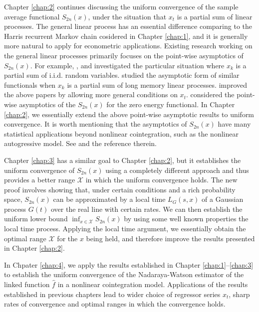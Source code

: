 Chapter \ref{chap:2} continues discussing the uniform convergence of the sample average functional $S_{2n}(x)$, under the situation that $x_t$ is a partial sum of linear processes. The general linear process has an essential difference comparing to the Harris recurrent Markov chain cosidered in Chapter \ref{chap:1}, and it is generally more natural to apply for econometric applications. Existing research working on the general linear processes primarily focuses on the point-wise asymptotics of $S_{2n}(x)$. For example, \cite{borodinibragimov1995}, \cite{akonom1993} and \cite{phillipspark1998} investigated the particular situation where $x_{k}$ is a partial sum of i.i.d. random variables. \cite{jeganathan2004} studied the asymptotic form of similar functionals when $x_{k}$ is a partial sum of long memory linear processes. \cite{wangphillips2010a} improved the above papers by allowing more general conditions on $x_t$.  \cite{wangphillips2010b} considered the point-wise asymptotics of the $S_{2n}(x)$ for the zero energy functional.  In Chapter \ref{chap:2}, we essentially extend the above point-wise asymptotic results to uniform convergence. It is worth mentioning that the asymptotics of $S_{2n}(x)$ have many statistical applications beyond nonlinear cointegration, such as the nonlinear autogressive model. See \citet[][\citeyear{wangphillips2012}]{wangphillips2010b} and the reference therein.


Chapter \ref{chap:3} has a similar goal to Chapter \ref{chap:2}, but it establishes the uniform convergence of $S_{2n}(x)$ using a completely different approach and thus provides a better range $\mathcal X$ in which the uniform convergence holds. The new proof involves showing that, under certain conditions and a rich probability space, $S_{2n}(x)$ can be approximated by a local time $L_G(s, x)$ of a Gaussian process $G(t)$ over the real line with certain rates.  We can then establish the uniform lower bound $\inf_{x \in \mathcal X} S_{2n}(x)$ by using some well known properties the local time process. Applying the local time argument, we essentially obtain the optimal range $\mathcal{X}$ for the $x$ being held, and therefore improve the results presented in Chapter \ref{chap:2}.

In Chpater \ref{chap:4}, we apply the results established in Chapter \ref{chap:1}--\ref{chap:3} to establish the uniform convergence of the Nadaraya-Watson estimator of the linked function $\widehat{f}$ in a nonlinear cointegration model. Applications of the results established in previous chapters lead to wider choice of regressor series $x_t$, sharp rates of convergence and optimal ranges in which the convergence holds. 

